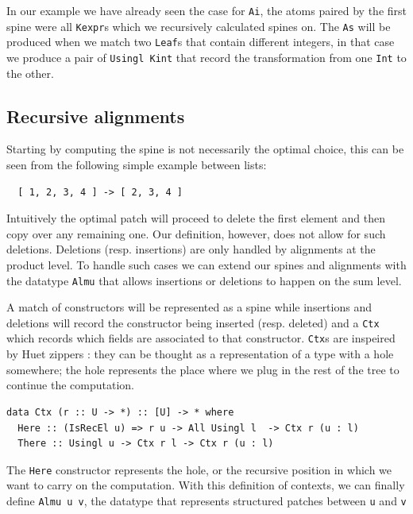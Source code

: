 \documentclass[11pt, titlepage]{article}
\newcommand{\toHaskell}[1]{\texttt{#1}\xspace}
\begin{document}
In our example we have already seen the case for \texttt{Ai}, the atoms paired 
by the first spine were all \texttt{Kexpr}s which we recursively calculated spines on. 
The \texttt{As} will be produced when we match two \texttt{Leaf}s that contain 
different integers, in that case we produce a pair of \texttt{Usingl Kint} that record 
the transformation from one \texttt{Int} to the other.

\subsection{Recursive alignments}\label{recursive alignments}

Starting by computing the spine is not necessarily the optimal choice, this can 
be seen from the following simple example between lists:

\begin{verbatim}
  [ 1, 2, 3, 4 ] -> [ 2, 3, 4 ]
\end{verbatim}
Intuitively the optimal patch will proceed to delete the first element and then 
copy over any remaining one. Our definition, however, does not allow for such 
deletions. Deletions (resp. insertions) are only handled by alignments at the product level. To 
handle such cases we can extend our spines and alignments with the datatype 
\texttt{Almu} that allows insertions or deletions to happen on the sum level.

A match of constructors will be represented as a spine while insertions and 
deletions will record the constructor being inserted (resp. deleted) and a 
\texttt{Ctx} which records which fields are associated to that constructor.
\texttt{Ctx}s are inspeired by Huet zippers \cite{zippers}: they can be thought as a representation 
of a type with a hole somewhere; the hole represents the place where we 
plug in the rest of the tree to continue the computation.

\begin{verbatim}
data Ctx (r :: U -> *) :: [U] -> * where
  Here :: (IsRecEl u) => r u -> All Usingl l  -> Ctx r (u : l)
  There :: Usingl u -> Ctx r l -> Ctx r (u : l)
\end{verbatim}

The \toHaskell{Here} constructor represents the hole, or the recursive position in which we want to carry on the computation.
With this definition of contexts, we can finally define \toHaskell{Almu u v}, the datatype that represents structured patches between \toHaskell{u} and \toHaskell{v}
\end{document}
